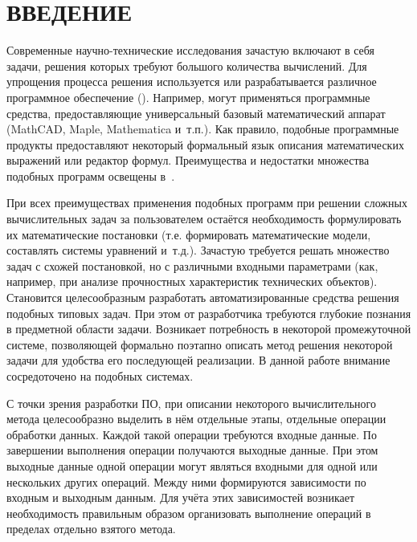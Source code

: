 \chapter*{ВВЕДЕНИЕ}\label{chap.introduction}

Современные научно-технические исследования зачастую включают в себя задачи, решения которых требуют большого количества вычислений. Для упрощения процесса решения используется или разрабатывается различное программное обеспечение (). Например, могут применяться программные средства, предоставляющие универсальный базовый математический аппарат (MathCAD, Maple, Mathematica и~т.п.). Как правило, подобные программные продукты предоставляют некоторый формальный язык описания математических выражений или редактор формул. Преимущества и недостатки множества подобных программ освещены в~\cite{WikiAlgebra2022}.

При всех преимуществах применения подобных программ при решении сложных вычислительных задач за пользователем остаётся необходимость формулировать их математические постановки (т.е. формировать математические модели, составлять системы уравнений и~т.д.). Зачастую требуется решать множество задач с схожей постановкой, но с различными входными параметрами (как, например, при анализе прочностных характеристик технических объектов). Становится целесообразным разработать автоматизированные средства решения подобных типовых задач. При этом от разработчика требуются глубокие познания в предметной области задачи. Возникает потребность в некоторой промежуточной системе, позволяющей формально поэтапно описать метод решения некоторой задачи для удобства его последующей реализации. В данной работе внимание сосредоточено на подобных системах.

С точки зрения разработки ПО, при описании некоторого вычислительного метода целесообразно выделить в нём отдельные этапы, отдельные операции обработки данных. Каждой такой операции требуются входные данные. По завершении выполнения операции получаются выходные данные. При этом выходные данные одной операции могут являться входными для одной или нескольких других операций. Между ними формируются зависимости по входным и выходным данным. Для учёта этих зависимостей возникает необходимость правильным образом организовать выполнение операций в пределах отдельно взятого метода.

